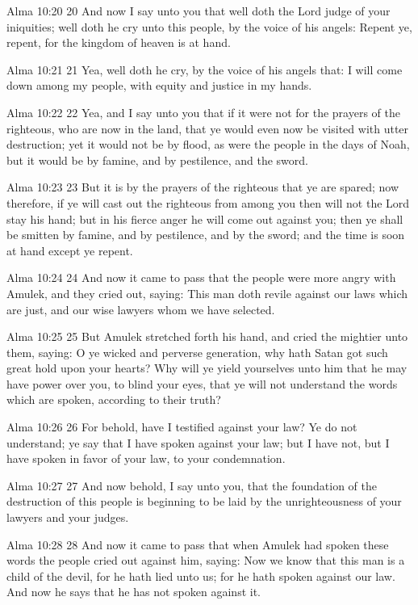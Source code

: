 Alma 10:20
 20 And now I say unto you that well doth the Lord judge of your
iniquities; well doth he cry unto this people, by the voice of
his angels: Repent ye, repent, for the kingdom of heaven is at
hand.

Alma 10:21
 21 Yea, well doth he cry, by the voice of his angels that: I
will come down among my people, with equity and justice in my
hands.

Alma 10:22
 22 Yea, and I say unto you that if it were not for the prayers
of the righteous, who are now in the land, that ye would even now
be visited with utter destruction; yet it would not be by flood,
as were the people in the days of Noah, but it would be by
famine, and by pestilence, and the sword.

Alma 10:23
 23 But it is by the prayers of the righteous that ye are spared;
now therefore, if ye will cast out the righteous from among you
then will not the Lord stay his hand; but in his fierce anger he
will come out against you; then ye shall be smitten by famine,
and by pestilence, and by the sword; and the time is soon at hand
except ye repent.

Alma 10:24
 24 And now it came to pass that the people were more angry with
Amulek, and they cried out, saying: This man doth revile against
our laws which are just, and our wise lawyers whom we have
selected.

Alma 10:25
 25 But Amulek stretched forth his hand, and cried the mightier
unto them, saying: O ye wicked and perverse generation, why hath
Satan got such great hold upon your hearts? Why will ye yield
yourselves unto him that he may have power over you, to blind
your eyes, that ye will not understand the words which are
spoken, according to their truth?

Alma 10:26
 26 For behold, have I testified against your law? Ye do not
understand; ye say that I have spoken against your law; but I
have not, but I have spoken in favor of your law, to your
condemnation.

Alma 10:27
 27 And now behold, I say unto you, that the foundation of the
destruction of this people is beginning to be laid by the
unrighteousness of your lawyers and your judges.

Alma 10:28
 28 And now it came to pass that when Amulek had spoken these
words the people cried out against him, saying: Now we know that
this man is a child of the devil, for he hath lied unto us; for
he hath spoken against our law. And now he says that he has not
spoken against it.

